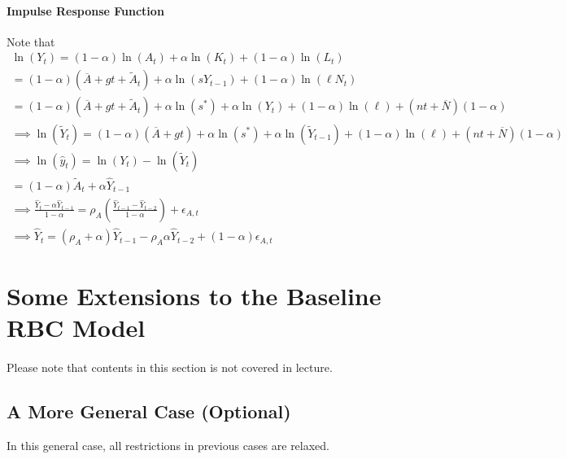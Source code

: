 \documentclass[11pt]{article}
\begin{document}
		\paragraph{Impulse Response Function} Note that
		\begin{gather}
			\ln(Y_t) = (1 - \alpha) \ln(A_t) + \alpha \ln (K_t) + (1-\alpha) \ln (L_t) \\
			= (1 - \alpha) (\overline{A} + gt + \tilde{A}_t) + \alpha \ln(s Y_{t-1}) + (1-\alpha) \ln(\ell N_t) \\
			= (1 - \alpha) (\overline{A} + gt + \tilde{A}_t) + \alpha \ln (s^*) + \alpha \ln(Y_t) + (1-\alpha) \ln (\ell) + (nt + \overline{N})(1-\alpha) \\
			\implies \ln(\tilde{Y}_t) = (1-\alpha) (\overline{A} + gt) + \alpha \ln(s^*) + \alpha \ln(\tilde{Y}_{t-1}) + (1-\alpha) \ln(\ell) + (nt + \overline{N})(1-\alpha) \\
			\implies \ln(\hat{y}_t) = \ln(Y_t) - \ln(\tilde{Y}_t) \\
			= (1-\alpha)\tilde{A}_t + \alpha \hat{Y}_{t-1} \\
			\implies \frac{\hat{Y}_t - \alpha \hat{Y}_{t-1}}{1-\alpha} = \rho_A (\frac{\hat{Y}_{t-1} - \hat{Y}_{t-2}}{1-\alpha}) + \epsilon_{A, t} \\
			\implies \hat{Y}_{t} = (\rho_A + \alpha) \hat{Y}_{t-1} - \rho_A \alpha \hat{Y}_{t-2} + (1 - \alpha)\epsilon_{A, t}
		\end{gather}
	
	\section{Some Extensions to the Baseline RBC Model}
	\paragraph{} Please note that contents in this section is not covered in lecture.
		\subsection{A More General Case (Optional)}
			\begin{assumption}
				In this general case, all restrictions in previous cases are relaxed.
			\end{assumption}
			
\end{document}
